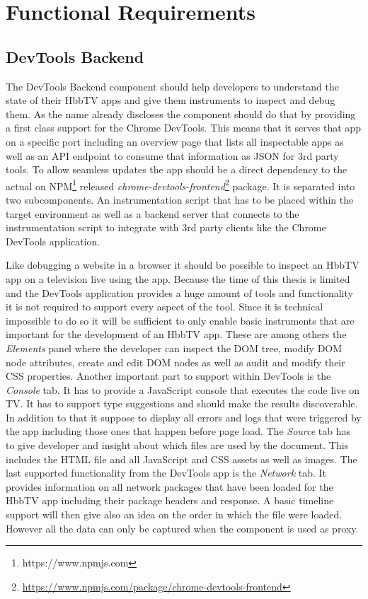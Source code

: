\section{Functional Requirements\label{sec:reqsuba}}

\subsection{DevTools Backend}

The DevTools Backend component should help developers to understand the state of their HbbTV
apps and give them instruments to inspect and debug them. As the name already discloses
the component should do that by providing a first class support for the Chrome DevTools.
This means that it serves that app on a specific port including an overview page that lists
all inspectable apps as well as an API endpoint to consume that information as JSON for
3rd party tools. To allow seamless updates the app should be a direct dependency to the actual
on NPM\footnote{https://www.npmjs.com} released \textit{chrome-devtools-frontend}\footnote{\url{https://www.npmjs.com/package/chrome-devtools-frontend}}
package. It is separated into two subcomponents. An instrumentation script that has to be
placed within the target environment as well as a backend server that connects to the
instrumentation script to integrate with 3rd party clients like the Chrome DevTools application.

Like debugging a website in a browser it should be possible to inspect an HbbTV app on a
television live using the app. Because the time of this thesis is limited and the DevTools
application provides a huge amount of tools and functionality it is not required to support
every aspect of the tool. Since it is technical impossible to do so it will be sufficient to
only enable basic instruments that are important for the development of an HbbTV app. These
are among others the \textit{Elements} panel where the developer can inspect the DOM tree,
modify DOM node attributes, create and edit DOM nodes as well as audit and modify their
CSS properties. Another important part to support within DevTools is the \textit{Console}
tab. It has to provide a JavaScript console that executes the code live on TV. It has to
support type suggestions and should make the results discoverable. In addition to that it
suppose to display all errors and logs that were triggered by the app including those ones
that happen before page load. The \textit{Source} tab has to give developer and insight
about which files are used by the document. This includes the HTML file and all JavaScript
and CSS assets as well as images. The last supported functionality from the DevTools app is
the \textit{Network} tab. It provides information on all network packages that have been
loaded for the HbbTV app including their package headers and response. A basic timeline support
will then give also an idea on the order in which the file were loaded. However all the data
can only be captured when the component is used as proxy.

